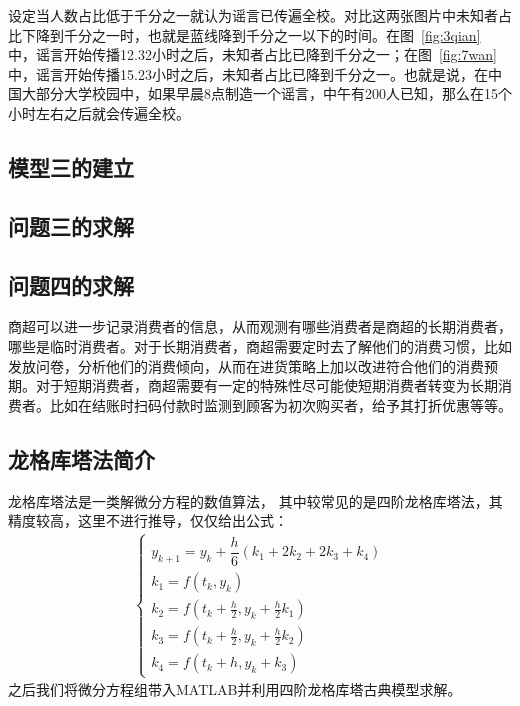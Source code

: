 \documentclass[withoutpreface,bwprint]{cumcmthesis}
\begin{document}
设定当人数占比低于千分之一就认为谣言已传遍全校。对比这两张图片中未知者占比下降到千分之一时，也就是蓝线降到千分之一以下的时间。在图~\ref{fig:3qian} 中，谣言开始传播12.32小时之后，未知者占比已降到千分之一；在图~\ref{fig:7wan} 中，谣言开始传播15.23小时之后，未知者占比已降到千分之一。也就是说，在中国大部分大学校园中，如果早晨8点制造一个谣言，中午有200人已知，那么在15个小时左右之后就会传遍全校。

\subsection{模型三的建立}
\subsection{问题三的求解}
\subsection{问题四的求解}
商超可以进一步记录消费者的信息，从而观测有哪些消费者是商超的长期消费者，哪些是临时消费者。对于长期消费者，商超需要定时去了解他们的消费习惯，比如发放问卷，分析他们的消费倾向，从而在进货策略上加以改进符合他们的消费预期。对于短期消费者，商超需要有一定的特殊性尽可能使短期消费者转变为长期消费者。比如在结账时扫码付款时监测到顾客为初次购买者，给予其打折优惠等等。




\subsection{龙格库塔法简介}
龙格库塔法\cite{ref5}是一类解微分方程的数值算法， 其中较常见的是四阶龙格库塔法，其精度较高，这里不进行推导，仅仅给出公式：
\begin{align*}
	\begin{cases}
		y_{k+1} = y_k + \dfrac{h}{6}(k_1+2k_2+2k_3+k_4) \\
		k_{1} = f(t_k,y_k)\\
		k_{2} = f(t_k+\frac{h}{2},y_k+\frac{h}{2}k_1)\\
		k_{3} = f(t_k+\frac{h}{2},y_k+\frac{h}{2}k_2)\\
		k_{4} = f(t_k+h,y_k+k_3)
	\end{cases}
\end{align*}
之后我们将微分方程组带入MATLAB并利用四阶龙格库塔古典模型求解。
\end{document}
